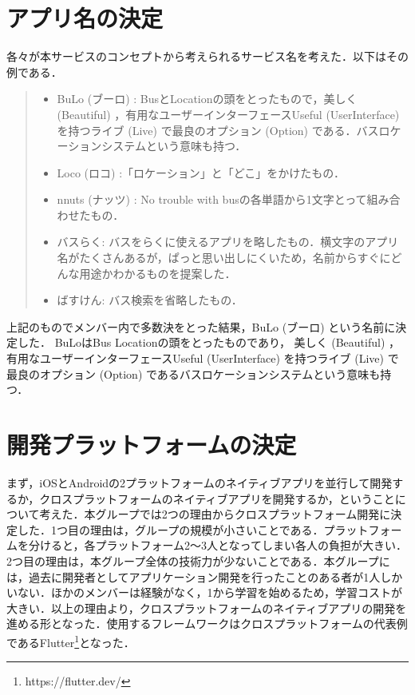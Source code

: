 \section{アプリ名の決定}
各々が本サービスのコンセプトから考えられるサービス名を考えた．以下はその例である．
\begin{quote}
    \begin{itemize}
        \item BuLo (ブーロ) : BusとLocationの頭をとったもので，美しく (Beautiful) ，有用なユーザーインターフェースUseful (UserInterface) を持つライブ (Live) で最良のオプション (Option) である．バスロケーションシステムという意味も持つ．
        \item Loco (ロコ) :「ロケーション」と「どこ」をかけたもの．
        \item nnuts (ナッツ) : No trouble with busの各単語から1文字とって組み合わせたもの．
        \item バスらく: バスをらくに使えるアプリを略したもの．横文字のアプリ名がたくさんあるが，ぱっと思い出しにくいため，名前からすぐにどんな用途かわかるものを提案した．
        \item ばすけん: バス検索を省略したもの．
    \end{itemize}
\end{quote}
上記のものでメンバー内で多数決をとった結果，BuLo (ブーロ) という名前に決定した．
BuLoはBus Locationの頭をとったものであり，
美しく (Beautiful) ，有用なユーザーインターフェースUseful (UserInterface) を持つライブ (Live) で最良のオプション (Option) であるバスロケーションシステムという意味も持つ．

\section{開発プラットフォームの決定}
まず，iOSとAndroidの2プラットフォームのネイティブアプリを並行して開発するか，クロスプラットフォームのネイティブアプリを開発するか，ということについて考えた．本グループでは2つの理由からクロスプラットフォーム開発に決定した．1つ目の理由は，グループの規模が小さいことである．プラットフォームを分けると，各プラットフォーム2〜3人となってしまい各人の負担が大きい．2つ目の理由は，本グループ全体の技術力が少ないことである．本グループには，過去に開発者としてアプリケーション開発を行ったことのある者が1人しかいない．ほかのメンバーは経験がなく，1から学習を始めるため，学習コストが大きい．以上の理由より，クロスプラットフォームのネイティブアプリの開発を進める形となった．使用するフレームワークはクロスプラットフォームの代表例であるFlutter\footnote{https://flutter.dev/}となった．

